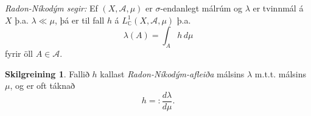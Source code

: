 \documentclass[a4paper,icelandic,11pt]{book}
\theoremstyle{plain}      \newtheorem{setn}{Setning}[chapter]
\theoremstyle{definition} \newtheorem{skilgr}[setn]{Skilgreining}
\theoremstyle{remark}     \newtheorem*{ath}{Athugasemd}
\newcommand{\C}{\mathbb C}
\begin{document}
\emph{Radon-Níkodým segir:} Ef $(X,\mathcal A,\mu)$ er
$\sigma$-endanlegt málrúm og $\lambda$ er tvinnmál á $X$
þ.a. $\lambda\ll\mu$, þá er til fall $h$ á $L_{\C}^{1}(X,\mathcal
A,\mu)$ þ.a. 
\[
\lambda(A) = \int_{A}h\,d\mu
\]
fyrir öll $A\in\mathcal A$.
\begin{skilgr}
  Fallið $h$ kallast
  \emph{Radon-Níkodým-afleiða} málsins
  $\lambda$ m.t.t. málsins $\mu$, og er oft táknað 
  \[
  h =: \frac{d\lambda}{d\mu}.
  \]
\end{skilgr}

\printindex
\end{document}
